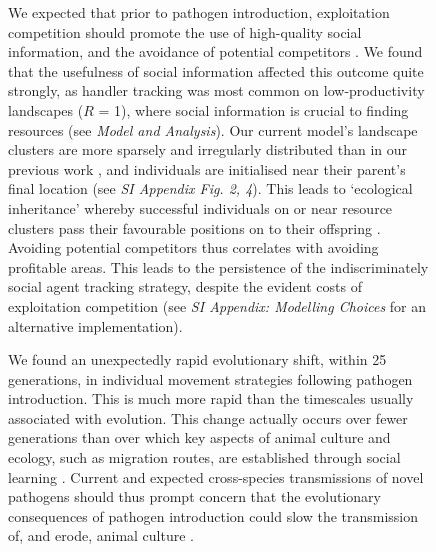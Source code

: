 \begin{figure}[!h]
We expected that prior to pathogen introduction, exploitation competition should promote the use of high-quality social information, and the avoidance of potential competitors \citep[handler tracking][]{gupte2021a}.
We found that the usefulness of social information affected this outcome quite strongly, as handler tracking was most common on low-productivity landscapes ($R$ = 1), where social information is crucial to finding resources (see \textit{Model and Analysis}).
Our current model's landscape clusters are more sparsely and irregularly distributed than in our previous work \citep{gupte2021a}, and individuals are initialised near their parent's final location (see \textit{SI Appendix Fig. 2, 4}).
This leads to `ecological inheritance' whereby successful individuals on or near resource clusters pass their favourable positions on to their offspring \citep{badyaev2009}.
Avoiding potential competitors thus correlates with avoiding profitable areas.
This leads to the persistence of the indiscriminately social agent tracking strategy, despite the evident costs of exploitation competition (see \textit{SI Appendix: Modelling Choices} for an alternative implementation).


We found an unexpectedly rapid evolutionary shift, within 25 generations, in individual movement strategies following pathogen introduction.
This is much more rapid than the timescales usually associated with evolution.
This change actually occurs over fewer generations than over which key aspects of animal culture and ecology, such as migration routes, are established through social learning \citep{jesmer2018,cantor2021}.
Current and expected cross-species transmissions of novel pathogens \citep{carlson2021,pusceddu2021} should thus prompt concern that the evolutionary consequences of pathogen introduction could slow the transmission of, and erode, animal culture \citep{cantor2021}.


\end{figure}
